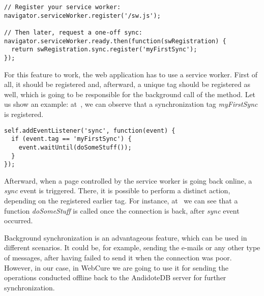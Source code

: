\begin{lstlisting}[caption={An example code, which demonstrates how to register a sync (\textit{myFirstSync} here) event for the service worker\cite{38}.}, label={lst:tech8}]
// Register your service worker:
navigator.serviceWorker.register('/sw.js');

// Then later, request a one-off sync:
navigator.serviceWorker.ready.then(function(swRegistration) {
  return swRegistration.sync.register('myFirstSync');
});
\end{lstlisting} 

For this feature to work, the web application has to use a service worker. First of all, it should be registered and, afterward, a unique tag should be registered as well, which is going to be responsible for the background call of the method. Let us show an example: at~, we can observe that a synchronization tag \textit{myFirstSync} is registered.

\begin{lstlisting}[caption={An example code, which demonstates that a function \textit{doSomeStuff} called, when the \textit{sync} event happened\cite{38}.}, label={lst:tech9}]
self.addEventListener('sync', function(event) {
  if (event.tag == 'myFirstSync') {
    event.waitUntil(doSomeStuff());
  }
});
\end{lstlisting} 

Afterward, when a page controlled by the service worker is going back online, a \textit{sync} event is triggered. There, it is possible to perform a distinct action, depending on the registered earlier tag. For instance, at~ we can see that a function \textit{doSomeStuff} is called once the connection is back, after \textit{sync} event occurred. 

Background synchronization is an advantageous feature, which can be used in different scenarios. It could be, for example, sending the e-mails or any other type of messages, after having failed to send it when the connection was poor. However, in our case, in WebCure we are going to use it for sending the operations conducted offline back to the AndidoteDB server for further synchronization.